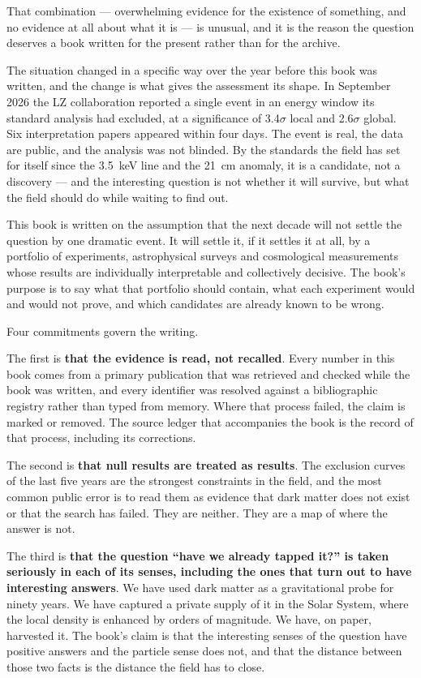 That combination --- overwhelming evidence for the existence of something, and
no evidence at all about what it is --- is unusual, and it is the reason the
question deserves a book written for the present rather than for the archive.

The situation changed in a specific way over the year before this book was
written, and the change is what gives the assessment its shape. In September
2026 the LZ collaboration reported a single event in an energy window its
standard analysis had excluded, at a significance of 3.4$\sigma$ local and 2.6$\sigma$
global. Six interpretation papers appeared within four days. The event is
real, the data are public, and the analysis was not blinded. By the
standards the field has set for itself since the 3.5~keV line and the
21~cm anomaly, it is a candidate, not a discovery --- and the interesting
question is not whether it will survive, but what the field should do while
waiting to find out.

This book is written on the assumption that the next decade will not settle
the question by one dramatic event. It will settle it, if it settles it at
all, by a portfolio of experiments, astrophysical surveys and cosmological
measurements whose results are individually interpretable and collectively
decisive. The book's purpose is to say what that portfolio should contain,
what each experiment would and would not prove, and which candidates are
already known to be wrong.

Four commitments govern the writing.

The first is \textbf{that the evidence is read, not recalled}. Every number in
this book comes from a primary publication that was retrieved and checked
while the book was written, and every identifier was resolved against a
bibliographic registry rather than typed from memory. Where that process
failed, the claim is marked or removed. The source ledger that accompanies the
book is the record of that process, including its corrections.

The second is \textbf{that null results are treated as results}. The exclusion
curves of the last five years are the strongest constraints in the field, and
the most common public error is to read them as evidence that dark matter
does not exist or that the search has failed. They are neither. They are a
map of where the answer is not.

The third is \textbf{that the question ``have we already tapped it?'' is taken
seriously in each of its senses, including the ones that turn out to have
interesting answers}. We have used dark matter as a gravitational probe for
ninety years. We have captured a private supply of it in the Solar System,
where the local density is enhanced by orders of magnitude. We have, on
paper, harvested it. The book's claim is that the interesting senses of the
question have positive answers and the particle sense does not, and that the
distance between those two facts is the distance the field has to close.

